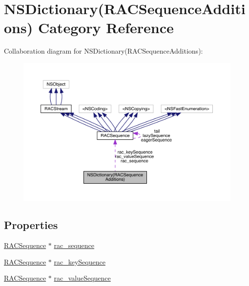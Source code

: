 \hypertarget{category_n_s_dictionary_07_r_a_c_sequence_additions_08}{}\section{N\+S\+Dictionary(R\+A\+C\+Sequence\+Additions) Category Reference}
\label{category_n_s_dictionary_07_r_a_c_sequence_additions_08}


Collaboration diagram for N\+S\+Dictionary(R\+A\+C\+Sequence\+Additions)\+:\nopagebreak
\begin{figure}[H]
\begin{center}
\leavevmode
\includegraphics[width=350pt]{category_n_s_dictionary_07_r_a_c_sequence_additions_08__coll__graph}
\end{center}
\end{figure}
\subsection*{Properties}
\begin{DoxyCompactItemize}
\item 
\mbox{\hyperlink{interface_r_a_c_sequence}{R\+A\+C\+Sequence}} $\ast$ \mbox{\hyperlink{category_n_s_dictionary_07_r_a_c_sequence_additions_08_af918ec309498be9b1ff9881230614c69}{rac\+\_\+sequence}}
\item 
\mbox{\hyperlink{interface_r_a_c_sequence}{R\+A\+C\+Sequence}} $\ast$ \mbox{\hyperlink{category_n_s_dictionary_07_r_a_c_sequence_additions_08_a990cd3cf1e8698c8f42f3d5c39f12fa3}{rac\+\_\+key\+Sequence}}
\item 
\mbox{\hyperlink{interface_r_a_c_sequence}{R\+A\+C\+Sequence}} $\ast$ \mbox{\hyperlink{category_n_s_dictionary_07_r_a_c_sequence_additions_08_ae87e0a78cf9cab6be27e18b0c3016439}{rac\+\_\+value\+Sequence}}
\end{DoxyCompactItemize}


